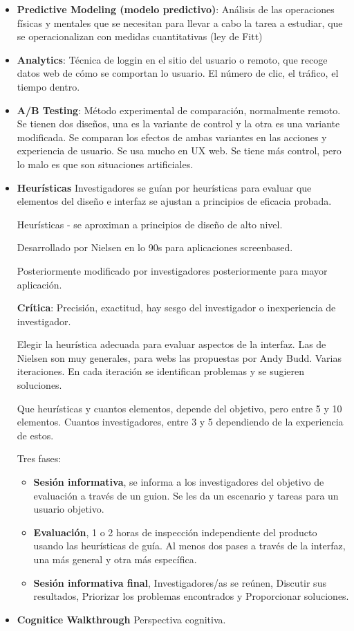 \documentclass[12pt, twoside, openright]{report} %
\begin{document}
\begin{itemize}
	\item \textbf{Predictive Modeling (modelo predictivo)}: Análisis de las operaciones físicas y mentales que se necesitan para llevar a cabo la tarea a estudiar, que se operacionalizan con medidas cuantitativas (ley de Fitt)
	\item \textbf{Analytics}: Técnica de loggin en el sitio del usuario o remoto, que recoge datos web de cómo se comportan lo usuario. El número de clic, el tráfico, el tiempo dentro.
	\item \textbf{A/B Testing}: Método experimental de comparación, normalmente remoto. Se tienen dos diseños, una es la variante de control y la otra es una variante modificada. Se comparan los efectos de ambas variantes en las acciones y experiencia de usuario. Se usa mucho en UX web. Se tiene más control, pero lo malo es que son situaciones artificiales.
	\item \textbf{Heurísticas}
	      Investigadores se guían por heurísticas para evaluar que elementos del diseño e interfaz se ajustan a principios de eficacia probada.

	      Heurísticas - se aproximan a principios de diseño de alto nivel.

	      Desarrollado por Nielsen en lo 90s para aplicaciones screenbased.

	      Posteriormente modificado por investigadores posteriormente para mayor aplicación.

	      \textbf{Crítica}: Precisión, exactitud, hay sesgo del investigador o inexperiencia de investigador.

	      Elegir la heurística adecuada para evaluar aspectos de la interfaz. Las de Nielsen son muy generales, para webs las propuestas por Andy Budd. Varias iteraciones. En cada iteración se identifican problemas y se sugieren soluciones.

	      Que heurísticas y cuantos elementos, depende del objetivo, pero entre 5 y 10 elementos. Cuantos investigadores, entre 3 y 5 dependiendo de la experiencia de estos.

	      Tres fases:
	      \begin{itemize}
		      \item \textbf{Sesión informativa}, se informa a los investigadores del objetivo de evaluación a través de un guion. Se les da un escenario y tareas para un usuario objetivo.
		      \item \textbf{Evaluación}, 1 o 2 horas de inspección independiente del producto usando las heurísticas de guía. Al menos dos pases a través de la interfaz, una más general y otra más específica.
		      \item \textbf{Sesión informativa final}, Investigadores/as se reúnen, Discutir sus resultados, Priorizar los problemas encontrados y Proporcionar soluciones.
	      \end{itemize}
	\item \textbf{Cognitice Walkthrough}
	      Perspectiva cognitiva.


\end{itemize}
\end{document}
